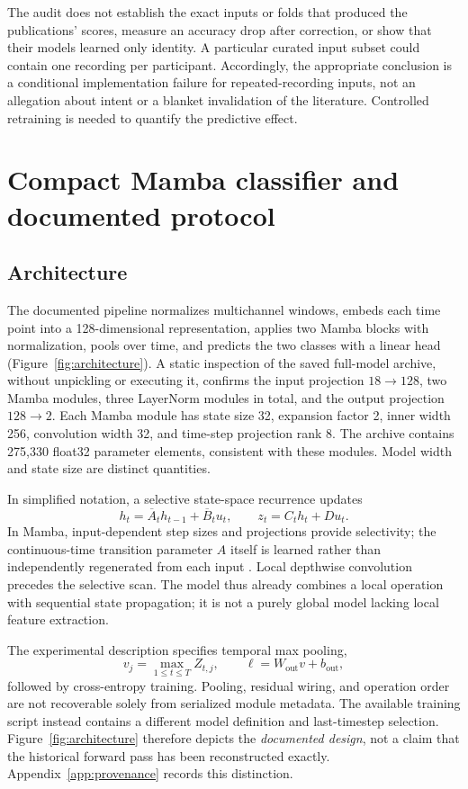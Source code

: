 The audit does not establish the exact inputs or folds that produced the publications' scores, measure an accuracy drop after correction, or show that their models learned only identity. A particular curated input subset could contain one recording per participant. Accordingly, the appropriate conclusion is a conditional implementation failure for repeated-recording inputs, not an allegation about intent or a blanket invalidation of the literature. Controlled retraining is needed to quantify the predictive effect.

\section{Compact Mamba classifier and documented protocol}
\label{sec:model}
\subsection{Architecture}
The documented pipeline normalizes multichannel windows, embeds each time point into a 128-dimensional representation, applies two Mamba blocks with normalization, pools over time, and predicts the two classes with a linear head (Figure~\ref{fig:architecture}). A static inspection of the saved full-model archive, without unpickling or executing it, confirms the input projection $18\rightarrow128$, two Mamba modules, three LayerNorm modules in total, and the output projection $128\rightarrow2$. Each Mamba module has state size 32, expansion factor 2, inner width 256, convolution width 32, and time-step projection rank 8. The archive contains 275,330 float32 parameter elements, consistent with these modules. Model width and state size are distinct quantities.

In simplified notation, a selective state-space recurrence updates
\begin{equation}
 h_t=\overline A_t h_{t-1}+\overline B_t u_t,
 \qquad z_t=C_t h_t+D u_t.
\end{equation}
In Mamba, input-dependent step sizes and projections provide selectivity; the continuous-time transition parameter $A$ itself is learned rather than independently regenerated from each input \citep{gu2024}. Local depthwise convolution precedes the selective scan. The model thus already combines a local operation with sequential state propagation; it is not a purely global model lacking local feature extraction.

The experimental description specifies temporal max pooling,
\begin{equation}
  v_j=\max_{1\leq t\leq T} Z_{t,j},\qquad
  \ell=W_{\mathrm{out}}v+b_{\mathrm{out}},
\end{equation}
followed by cross-entropy training. Pooling, residual wiring, and operation order are not recoverable solely from serialized module metadata. The available training script instead contains a different model definition and last-timestep selection. Figure~\ref{fig:architecture} therefore depicts the \emph{documented design}, not a claim that the historical forward pass has been reconstructed exactly. Appendix~\ref{app:provenance} records this distinction.


